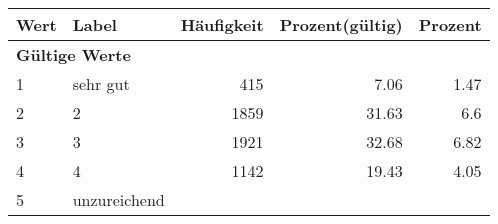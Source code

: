      \begin{longtable}{lXrrr}
     \toprule
     \textbf{Wert} & \textbf{Label} & \textbf{Häufigkeit} & \textbf{Prozent(gültig)} & \textbf{Prozent} \\
     \endhead
     \midrule
     \multicolumn{5}{l}{\textbf{Gültige Werte}}\\

     1 &
     \multicolumn{1}{X}{ sehr gut   } &


       \num{415} &
       \num[round-mode=places,round-precision=2]{7.06} &
         \num[round-mode=places,round-precision=2]{1.47} \\

     2 &
     \multicolumn{1}{X}{ 2   } &


       \num{1859} &
       \num[round-mode=places,round-precision=2]{31.63} &
         \num[round-mode=places,round-precision=2]{6.6} \\

     3 &
     \multicolumn{1}{X}{ 3   } &


       \num{1921} &
       \num[round-mode=places,round-precision=2]{32.68} &
         \num[round-mode=places,round-precision=2]{6.82} \\

     4 &
     \multicolumn{1}{X}{ 4   } &


       \num{1142} &
       \num[round-mode=places,round-precision=2]{19.43} &
         \num[round-mode=places,round-precision=2]{4.05} \\

     5 &
     \multicolumn{1}{X}{ unzureichend   } &



\end{longtable}
